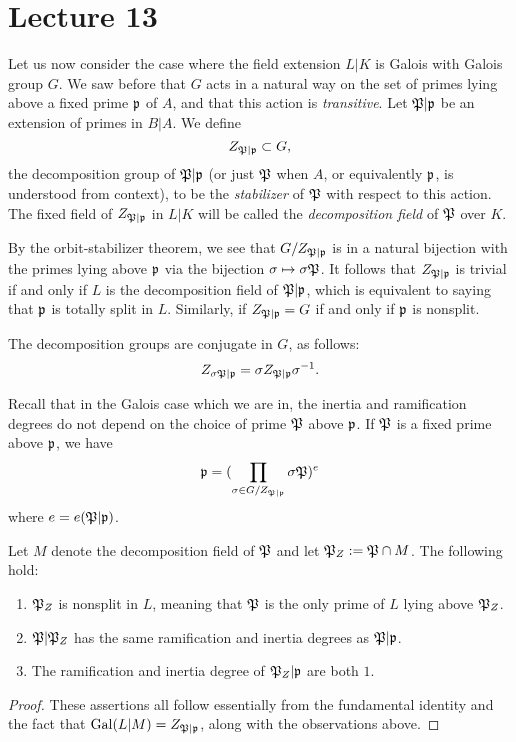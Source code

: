 \section{Lecture 13}

Let us now consider the case where the field extension $L|K$ is Galois with Galois group $G$.
We saw before that $G$ acts in a natural way on the set of primes lying above a fixed prime $\mathfrak{p}$ of $A$, and that this action is \emph{transitive}.
Let $\mathfrak{P}|\mathfrak{p}$ be an extension of primes in $B|A$.
We define
\[ Z_{\mathfrak{P}|\mathfrak{p}} \subset G, \]
the decomposition group of $\mathfrak{P}|\mathfrak{p}$ (or just $\mathfrak{P}$ when $A$, or equivalently $\mathfrak{p}$, is understood from context), to be the \emph{stabilizer} of $\mathfrak{P}$ with respect to this action.
The fixed field of $Z_{\mathfrak{P}|\mathfrak{p}}$ in $L|K$ will be called the \emph{decomposition field} of $\mathfrak{P}$ over $K$.

By the orbit-stabilizer theorem, we see that $G/Z_{\mathfrak{P}|\mathfrak{p}}$ is in a natural bijection with the primes lying above $\mathfrak{p}$ via the bijection $\sigma \mapsto \sigma\mathfrak{P}$.
It follows that $Z_{\mathfrak{P}|\mathfrak{p}}$ is trivial if and only if $L$ is the decomposition field of $\mathfrak{P}|\mathfrak{p}$, which is equivalent to saying that $\mathfrak{p}$ is totally split in $L$.
Similarly, if $Z_{\mathfrak{P}|\mathfrak{p}} = G$ if and only if $\mathfrak{p}$ is nonsplit.

The decomposition groups are conjugate in $G$, as follows:
\[ Z_{\sigma\mathfrak{P}|\mathfrak{p}} = \sigma Z_{\mathfrak{P}|\mathfrak{p}} \sigma^{-1}. \]

Recall that in the Galois case which we are in, the inertia and ramification degrees do not depend on the choice of prime $\mathfrak{P}$ above $\mathfrak{p}$.
If $\mathfrak{P}$ is a fixed prime above $\mathfrak{p}$, we have
\[ \mathfrak{p} = (\prod_{\sigma \in G/Z_{\mathfrak{P}|\mathfrak{p}}} \sigma\mathfrak{P})^{e} \]
where $e = e(\mathfrak{P}|\mathfrak{p})$.

\begin{proposition}
  Let $M$ denote the decomposition field of $\mathfrak{P}$ and let $\mathfrak{P}_{Z} := \mathfrak{P} \cap M$.
  The following hold:
  \begin{enumerate}
    \item $\mathfrak{P}_{Z}$ is nonsplit in $L$, meaning that $\mathfrak{P}$ is the only prime of $L$ lying above $\mathfrak{P}_{Z}$.
    \item $\mathfrak{P}|\mathfrak{P}_{Z}$ has the same ramification and inertia degrees as $\mathfrak{P}|\mathfrak{p}$.
    \item The ramification and inertia degree of $\mathfrak{P}_{Z}|\mathfrak{p}$ are both $1$.
  \end{enumerate}
\end{proposition}
\begin{proof}
  These assertions all follow essentially from the fundamental identity and the fact that $\operatorname{Gal}(L|M) = Z_{\mathfrak{P}|\mathfrak{p}}$, along with the observations above.
\end{proof}

